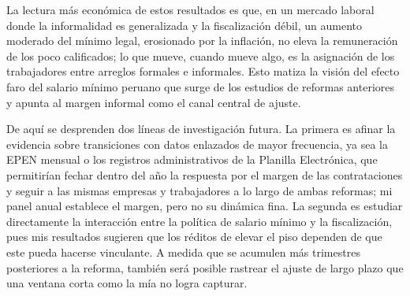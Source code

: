 La lectura más económica de estos resultados es que, en un mercado laboral donde la informalidad es generalizada y la fiscalización débil, un aumento moderado del mínimo legal, erosionado por la inflación, no eleva la remuneración de los poco calificados; lo que mueve, cuando mueve algo, es la asignación de los trabajadores entre arreglos formales e informales. Esto matiza la visión del efecto faro del salario mínimo peruano que surge de los estudios de reformas anteriores y apunta al margen informal como el canal central de ajuste.

De aquí se desprenden dos líneas de investigación futura. La primera es afinar la evidencia sobre transiciones con datos enlazados de mayor frecuencia, ya sea la EPEN mensual o los registros administrativos de la Planilla Electrónica, que permitirían fechar dentro del año la respuesta por el margen de las contrataciones y seguir a las mismas empresas y trabajadores a lo largo de ambas reformas; mi panel anual establece el margen, pero no su dinámica fina. La segunda es estudiar directamente la interacción entre la política de salario mínimo y la fiscalización, pues mis resultados sugieren que los réditos de elevar el piso dependen de que este pueda hacerse vinculante. A medida que se acumulen más trimestres posteriores a la reforma, también será posible rastrear el ajuste de largo plazo que una ventana corta como la mía no logra capturar.
